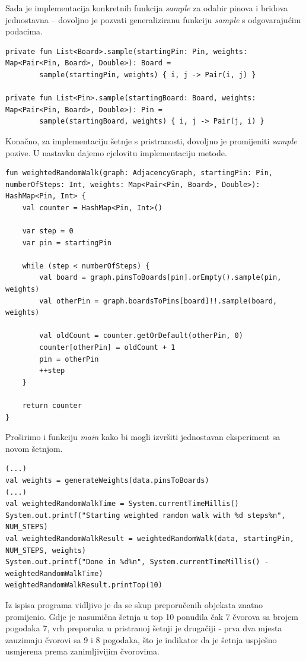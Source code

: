 \documentclass[times, utf8, seminar]{fer}
\begin{document}
Sada je implementacija konkretnih funkcija \textit{sample} za odabir pinova i bridova jednostavna -- dovoljno je pozvati generaliziranu funkciju \textit{sample} s odgovarajućim podacima.

\begin{lstlisting}
private fun List<Board>.sample(startingPin: Pin, weights: Map<Pair<Pin, Board>, Double>): Board =
        sample(startingPin, weights) { i, j -> Pair(i, j) }

private fun List<Pin>.sample(startingBoard: Board, weights: Map<Pair<Pin, Board>, Double>): Pin =
        sample(startingBoard, weights) { i, j -> Pair(j, i) }
\end{lstlisting}

Konačno, za implementaciju šetnje s pristranosti, dovoljno je promijeniti \textit{sample} pozive. U nastavku dajemo cjelovitu implementaciju metode.

\begin{lstlisting}
fun weightedRandomWalk(graph: AdjacencyGraph, startingPin: Pin, numberOfSteps: Int, weights: Map<Pair<Pin, Board>, Double>): HashMap<Pin, Int> {
    val counter = HashMap<Pin, Int>()

    var step = 0
    var pin = startingPin

    while (step < numberOfSteps) {
        val board = graph.pinsToBoards[pin].orEmpty().sample(pin, weights)
        val otherPin = graph.boardsToPins[board]!!.sample(board, weights)

        val oldCount = counter.getOrDefault(otherPin, 0)
        counter[otherPin] = oldCount + 1
        pin = otherPin
        ++step
    }

    return counter
}
\end{lstlisting}

Proširimo i funkciju \textit{main} kako bi mogli izvršiti jednostavan eksperiment sa novom šetnjom.

\begin{lstlisting}
(...)
val weights = generateWeights(data.pinsToBoards)
(...)
val weightedRandomWalkTime = System.currentTimeMillis()
System.out.printf("Starting weighted random walk with %d steps%n", NUM_STEPS)
val weightedRandomWalkResult = weightedRandomWalk(data, startingPin, NUM_STEPS, weights)
System.out.printf("Done in %d%n", System.currentTimeMillis() - weightedRandomWalkTime)
weightedRandomWalkResult.printTop(10)
\end{lstlisting}

Iz ispisa programa vidljivo je da se skup preporučenih objekata znatno promijenio. Gdje je nasumična šetnja u top 10 ponudila čak 7 čvorova sa brojem pogodaka 7, vrh preporuka u pristranoj šetnji je drugačiji - prva dva mjesta zauzimaju čvorovi sa 9 i 8 pogodaka, što je indikator da je šetnja uspješno usmjerena prema zanimljivijim čvorovima.
\end{document}
